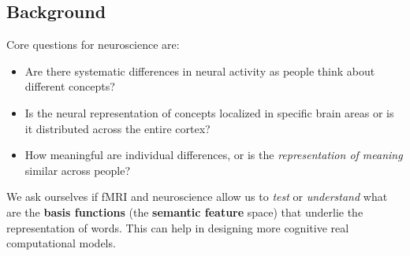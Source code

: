 \subsection{Background}
Core questions for neuroscience are:
\begin{itemize}
    \item Are there systematic differences in neural activity as people think about different concepts? 
    \item Is the neural representation of concepts localized in specific brain areas or is it distributed across the entire cortex?
    \item How meaningful are individual differences, or is the \textit{representation of meaning} similar across people?
\end{itemize}

We ask ourselves if fMRI and neuroscience allow us to \textit{test} or \textit{understand} what are the \textbf{basis functions} (the \textbf{semantic feature} space) that underlie the representation of words. This can help in designing more cognitive real computational models.

